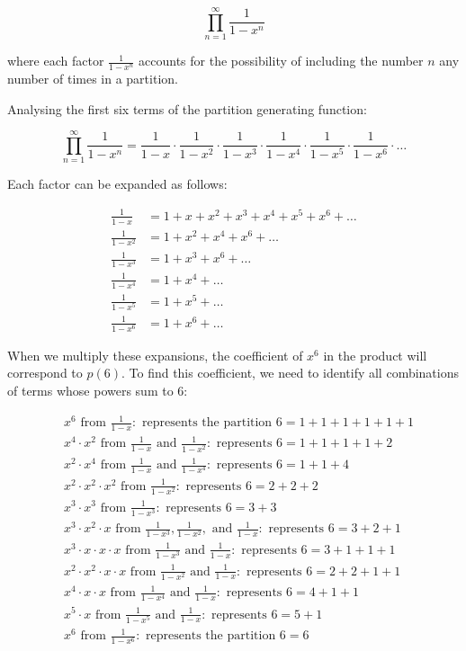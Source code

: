 \documentclass{article}
\theoremstyle{definition}
\begin{document}
\[
\prod_{n=1}^{\infty} \frac{1}{1 - x^n}
\]

\noindent
where each factor \( \frac{1}{1 - x^n} \) accounts for the possibility of including the number \( n \) any
number of times in a partition.

\noindent
Analysing the first six terms of the partition generating function:

\[
\prod_{n=1}^{\infty} \frac{1}{1 - x^n} = \frac{1}{1-x} \cdot \frac{1}{1-x^2} \cdot \frac{1}{1-x^3} \cdot \frac{1}{1-x^4} \cdot \frac{1}{1-x^5} \cdot \frac{1}{1-x^6} \cdot \dots
\]

\noindent
Each factor can be expanded as follows:

\[
\begin{aligned}
\frac{1}{1-x} &= 1 + x + x^2 + x^3 + x^4 + x^5 + x^6 + \dots \\
\frac{1}{1-x^2} &= 1 + x^2 + x^4 + x^6 + \dots \\
\frac{1}{1-x^3} &= 1 + x^3 + x^6 + \dots \\
\frac{1}{1-x^4} &= 1 + x^4 + \dots \\
\frac{1}{1-x^5} &= 1 + x^5 + \dots \\
\frac{1}{1-x^6} &= 1 + x^6 + \dots
\end{aligned}
\]

\noindent
When we multiply these expansions, the coefficient of $x^6$ in the product will correspond to $p(6)$. To find this coefficient, we need to identify all combinations of terms whose powers sum to 6:

\[
\begin{aligned}
&x^6 \text{ from } \frac{1}{1-x}: \text{ represents the partition } 6 = 1+1+1+1+1+1 \\
&x^4 \cdot x^2 \text{ from } \frac{1}{1-x} \text{ and } \frac{1}{1-x^2}: \text{ represents } 6 = 1+1+1+1+2 \\
&x^2 \cdot x^4 \text{ from } \frac{1}{1-x} \text{ and } \frac{1}{1-x^4}: \text{ represents } 6 = 1+1+4 \\
&x^2 \cdot x^2 \cdot x^2 \text{ from } \frac{1}{1-x^2}: \text{ represents } 6 = 2+2+2 \\
&x^3 \cdot x^3 \text{ from } \frac{1}{1-x^3}: \text{ represents } 6 = 3+3 \\
&x^3 \cdot x^2 \cdot x \text{ from } \frac{1}{1-x^3}, \frac{1}{1-x^2}, \text{ and } \frac{1}{1-x}: \text{ represents } 6 = 3+2+1 \\
&x^3 \cdot x \cdot x \cdot x \text{ from } \frac{1}{1-x^3} \text{ and } \frac{1}{1-x}: \text{ represents } 6 = 3+1+1+1 \\
&x^2 \cdot x^2 \cdot x \cdot x \text{ from } \frac{1}{1-x^2} \text{ and } \frac{1}{1-x}: \text{ represents } 6 = 2+2+1+1 \\
&x^4 \cdot x \cdot x \text{ from } \frac{1}{1-x^4} \text{ and } \frac{1}{1-x}: \text{ represents } 6 = 4+1+1 \\
&x^5 \cdot x \text{ from } \frac{1}{1-x^5} \text{ and } \frac{1}{1-x}: \text{ represents } 6 = 5+1 \\
&x^6 \text{ from } \frac{1}{1-x^6}: \text{ represents the partition } 6 = 6
\end{aligned}
\]
\end{document}
